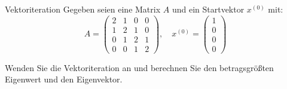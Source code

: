 \begin{example}{Vektoriteration}
    Gegeben seien eine Matrix $A$ und ein Startvektor $x^{(0)}$ mit:
    \[
        A =
        \begin{pmatrix}
            2 & 1 & 0 & 0 \\
            1 & 2 & 1 & 0 \\
            0 & 1 & 2 & 1 \\
            0 & 0 & 1 & 2
        \end{pmatrix}
        , \quad
        x^{(0)} =
        \begin{pmatrix}
            1 \\ 0 \\ 0 \\ 0
        \end{pmatrix}
    \]

    Wenden Sie die Vektoriteration an und berechnen Sie den betragsgrößten Eigenwert und den Eigenvektor.

    \exampleseparator


\end{example}
